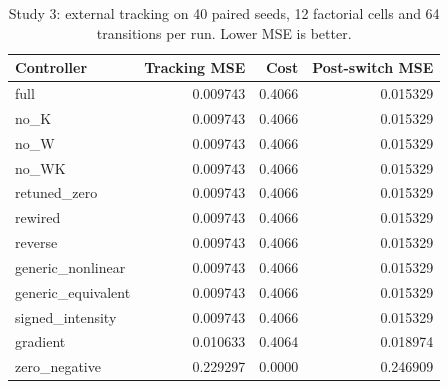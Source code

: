 \begin{table}[H]\centering\small
\caption{Study 3: external tracking on 40 paired seeds, 12 factorial cells and 64 transitions per run. Lower MSE is better.}
\label{tab:study3-results}
\begin{tabular}{lrrr}\toprule
Controller & Tracking MSE & Cost & Post-switch MSE \\ \midrule
full & 0.009743 & 0.4066 & 0.015329 \\
no\_K & 0.009743 & 0.4066 & 0.015329 \\
no\_W & 0.009743 & 0.4066 & 0.015329 \\
no\_WK & 0.009743 & 0.4066 & 0.015329 \\
retuned\_zero & 0.009743 & 0.4066 & 0.015329 \\
rewired & 0.009743 & 0.4066 & 0.015329 \\
reverse & 0.009743 & 0.4066 & 0.015329 \\
generic\_nonlinear & 0.009743 & 0.4066 & 0.015329 \\
generic\_equivalent & 0.009743 & 0.4066 & 0.015329 \\
signed\_intensity & 0.009743 & 0.4066 & 0.015329 \\
gradient & 0.010633 & 0.4064 & 0.018974 \\
zero\_negative & 0.229297 & 0.0000 & 0.246909 \\
\bottomrule\end{tabular}\end{table}
